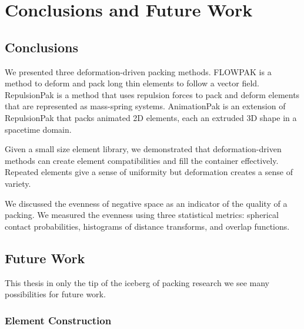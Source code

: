 
\chapter{Conclusions and Future Work}
\label{chapter_conclusions_and_future_work}

\section{Conclusions}

\newtext
{
We presented three deformation-driven packing methods.
FLOWPAK is a method to deform and pack long thin elements to follow a vector field.
RepulsionPak is a method that uses repulsion forces to pack and deform
elements that are represented as mass-spring systems.
AnimationPak is an extension of RepulsionPak that packs animated 2D elements,
each an extruded 3D shape in a spacetime domain.
}

\newtext
{
Given a small size element library, 
we demonstrated that deformation-driven methods can create element compatibilities
and fill the container effectively.
Repeated elements give a sense of uniformity but deformation creates a sense of variety.
}

\newtext
{
We discussed the evenness of negative space as an indicator of the quality of a packing.
We measured the evenness using three statistical metrics:
spherical contact probabilities, histograms of distance transforms, and overlap functions.
}

\section{Future Work}

\newtext
{
This thesis in only the tip of the iceberg of packing research 
we see many possibilities for future work.
}


\subsection{Element Construction}

